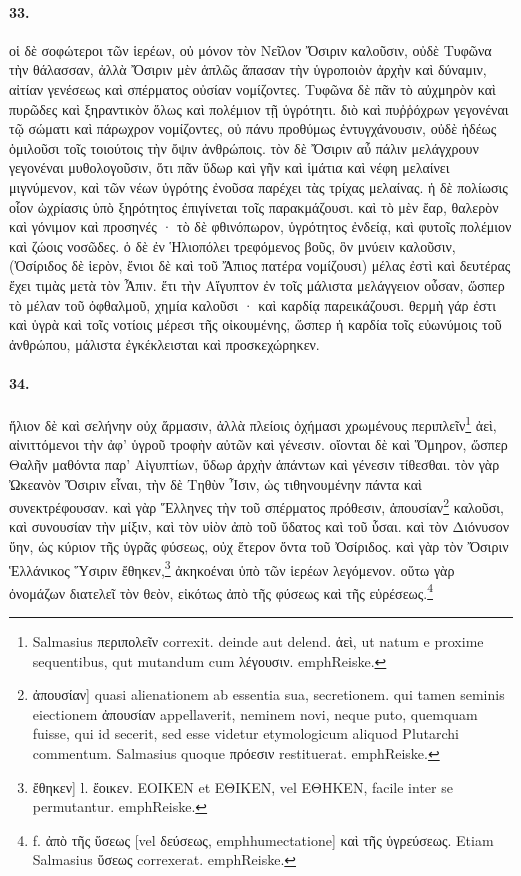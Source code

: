 \documentclass[a4paper, 11pt, oneside, polutonikogreek, german]{article}
\begin{document}
\paragraph{33.}
οἱ δὲ σοφώτεροι τῶν ἱερέων, οὐ μόνον τὸν Νεῖλον Ὄσιριν καλοῦσιν, οὐδὲ Τυφῶνα τὴν θάλασσαν, ἀλλὰ Ὄσιριν μὲν ἁπλῶς ἅπασαν τὴν ὑγροποιὸν ἀρχὴν καὶ δύναμιν, αἰτίαν γενέσεως καὶ σπέρματος οὐσίαν νομίζοντες. Τυφῶνα δὲ πᾶν τὸ αὐχμηρὸν καὶ πυρῶδες καὶ ξηραντικὸν ὅλως καὶ πολέμιον τῇ ὑγρότητι. διὸ καὶ πυῤῥόχρων γεγονέναι τῷ σώματι καὶ πάρωχρον νομίζοντες, οὐ πάνυ προθύμως ἐντυγχάνουσιν, οὐδὲ ἡδέως ὁμιλοῦσι τοῖς τοιούτοις τὴν ὄψιν ἀνθρώποις. τὸν δὲ Ὄσιριν αὖ πάλιν μελάγχρουν γεγονέναι μυθολογοῦσιν, ὅτι πᾶν ὕδωρ καὶ γῆν καὶ ἱμάτια καὶ νέφη μελαίνει μιγνύμενον, καὶ τῶν νέων ὑγρότης ἐνοῦσα παρέχει τὰς τρίχας μελαίνας. ἡ δὲ πολίωσις οἷον ὠχρίασις ὑπὸ ξηρότητος ἐπιγίνεται τοῖς παρακμάζουσι. καὶ τὸ μὲν ἔαρ, θαλερὸν καὶ γόνιμον καὶ προσηνές · τὸ δὲ φθινόπωρον, ὑγρότητος ἐνδείᾳ, καὶ φυτοῖς πολέμιον καὶ ζώοις νοσῶδες. ὁ δὲ ἐν Ἡλιοπόλει τρεφόμενος βοῦς, ὃν μνύειν καλοῦσιν, (Ὀσίριδος δὲ ἱερὸν, ἔνιοι δὲ καὶ τοῦ Ἄπιος πατέρα νομίζουσι) μέλας ἐστὶ καὶ δευτέρας ἔχει τιμὰς μετὰ τὸν Ἆπιν. ἔτι τὴν Αἴγυπτον ἐν τοῖς μάλιστα μελάγγειον οὖσαν, ὥσπερ τὸ μέλαν τοῦ ὀφθαλμοῦ, χημία καλοῦσι · καὶ καρδίᾳ παρεικάζουσι. θερμὴ γάρ ἐστι καὶ ὑγρὰ καὶ τοῖς νοτίοις μέρεσι τῆς οἰκουμένης, ὥσπερ ἡ καρδία τοῖς εὐωνύμοις τοῦ ἀνθρώπου, μάλιστα ἐγκέκλεισται καὶ προσκεχώρηκεν.

\paragraph{34.}
ἥλιον δὲ καὶ σελήνην οὐχ ἅρμασιν, ἀλλὰ πλείοις ὀχήμασι χρωμένους περιπλεῖν\footnote{Salmasius περιπολεῖν correxit. deinde aut delend. ἁεὶ, ut natum e proxime sequentibus, qut mutandum cum λέγουσιν. emph{Reiske.}} ἀεὶ, αἰνιττόμενοι τὴν ἀφ' ὑγροῦ τροφὴν αὐτῶν καὶ γένεσιν. οἴονται δὲ καὶ Ὅμηρον, ὥσπερ Θαλῆν μαθόντα παρ' Αἰγυπτίων, ὕδωρ ἀρχὴν ἁπάντων καὶ γένεσιν τίθεσθαι. τὸν γὰρ Ὠκεανὸν Ὄσιριν εἶναι, τὴν δὲ Τηθὺν Ἶσιν, ὡς τιθηνουμένην πάντα καὶ συνεκτρέφουσαν. καὶ γὰρ Ἕλληνες τὴν τοῦ σπέρματος πρόθεσιν, ἀπουσίαν\footnote{ἀπουσίαν] quasi alienationem ab essentia sua, secretionem. qui tamen seminis eiectionem ἀπουσίαν appellaverit, neminem novi, neque puto, quemquam fuisse, qui id secerit, sed esse videtur etymologicum aliquod Plutarchi commentum. Salmasius quoque πρόεσιν restituerat. emph{Reiske.}} καλοῦσι, καὶ συνουσίαν τὴν μίξιν, καὶ τὸν υἱὸν ἀπὸ τοῦ ὕδατος καὶ τοῦ ὗσαι. καὶ τὸν Διόνυσον ὕην, ὡς κύριον τῆς ὑγρᾶς φύσεως, οὐχ ἕτερον ὄντα τοῦ Ὀσίριδος. καὶ γὰρ τὸν Ὄσιριν Ἑλλάνικος Ὕσιριν ἔθηκεν,\footnote{ἔθηκεν] l. ἔοικεν. ΕΟΙΚΕΝ et ΕΘΙΚΕΝ, vel ΕΘΗΚΕΝ, facile inter se permutantur. emph{Reiske.}} ἀκηκοέναι ὑπὸ τῶν ἱερέων λεγόμενον. οὕτω γὰρ ὀνομάζων διατελεῖ τὸν θεὸν, εἰκότως ἀπὸ τῆς φύσεως καὶ τῆς εὑρέσεως.\footnote{f. ἀπὸ τῆς ὕσεως [vel δεύσεως, emph{humectatione}] καὶ τῆς ὑγρεύσεως. Etiam Salmasius ὕσεως correxerat. emph{Reiske.}}
\end{document}
